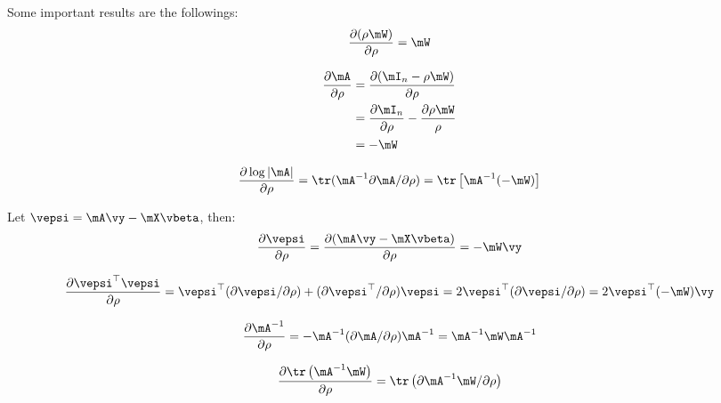 \documentclass[english,12pt]{book}\usepackage[]{graphicx}\usepackage[]{xcolor}
\begin{document}
\begin{definition}\label{definition:matrix_cal_sar}
Some important results  are the followings:
\begin{equation}\label{eq:mc_1}
\frac{\partial (\rho \mW)}{\partial \rho} = \mW
\end{equation}

\begin{equation}\label{eq:mc_2}
  \begin{aligned}
\frac{\partial \mA}{\partial \rho} & = \frac{\partial (\mI_n - \rho\mW)}{\partial \rho} \\
                                   & = \frac{\partial \mI_n}{\partial \rho} - \frac{\partial \rho\mW}{\rho} \\
                                   & = -\mW
 \end{aligned}
\end{equation}

\begin{equation}\label{eq:mc_3}
\frac{\partial \log \left|\mA\right|}{\partial \rho}  = \tr(\mA^{-1}\partial \mA / \partial \rho) = \tr\left[\mA^{-1}(-\mW)\right]
\end{equation}

Let $\vepsi = \mA\vy - \mX\vbeta$, then:
\begin{equation}\label{eq:mc_4}
  \frac{\partial \vepsi}{\partial \rho} =  \frac{\partial (\mA\vy - \mX\vbeta)}{\partial \rho} = -\mW\vy 
\end{equation}

\begin{equation}\label{eq:mc_5}
  \frac{\partial \vepsi^\top \vepsi}{\partial \rho} = \vepsi^\top (\partial \vepsi / \partial \rho) + (\partial \vepsi ^\top / \partial \rho)\vepsi = 2\vepsi^\top (\partial \vepsi / \partial \rho) = 2\vepsi^\top(-\mW)\vy
\end{equation}

\begin{equation}\label{eq:mc_6}
  \frac{\partial \mA^{-1}}{\partial \rho} = -\mA^{-1}(\partial \mA / \partial \rho)\mA^{-1} = \mA^{-1} \mW \mA^{-1}
\end{equation}

\begin{equation}\label{eq:mc_7}
  \frac{\partial \tr\left(\mA^{-1} \mW\right)}{\partial \rho} = \tr\left(\partial \mA^{-1}\mW / \partial \rho\right) 
\end{equation}
\end{definition}
\end{document}
